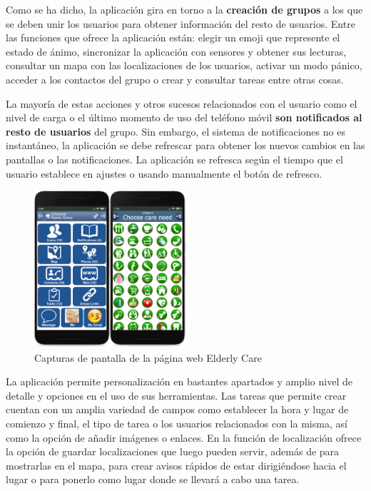 Como se ha dicho, la aplicación gira en torno a la \textbf{creación de grupos} a los que se deben unir los usuarios para obtener información del resto de usuarios. Entre las funciones que ofrece la aplicación están: elegir un emoji que represente el estado de ánimo, sincronizar la aplicación con sensores y obtener sus lecturas, consultar un mapa con las localizaciones de los usuarios, activar un modo pánico, acceder a los contactos del grupo o crear y consultar tareas entre otras cosas.

La mayoría de estas acciones y otros sucesos relacionados con el usuario como el nivel de carga o el último momento de uso del teléfono móvil \textbf{son notificados al resto de usuarios} del grupo. Sin embargo, el sistema de notificaciones no es instantáneo, la aplicación se debe refrescar para obtener los nuevos cambios en las pantallas o las notificaciones. La aplicación se refresca según el tiempo que el usuario establece en ajustes o usando manualmente el botón de refresco.

\begin{figure}[h]
    \centering
    \includegraphics[width=0.5\textwidth]{images/Introduccion/elderly-screenshot.png}
    \caption{Capturas de pantalla de la página web Elderly Care}
\end{figure}

La aplicación permite personalización en bastantes apartados y amplio nivel de detalle y opciones en el uso de sus herramientas. Las tareas que permite crear cuentan con un amplia variedad de campos como establecer la hora y lugar de comienzo y final, el tipo de tarea o los usuarios relacionados con la misma, así como la opción de añadir imágenes o enlaces. En la función de localización ofrece la opción de guardar localizaciones que luego pueden servir, además de para mostrarlas en el mapa, para crear avisos rápidos de estar dirigiéndose hacia el lugar o para ponerlo como lugar donde se llevará a cabo una tarea.

